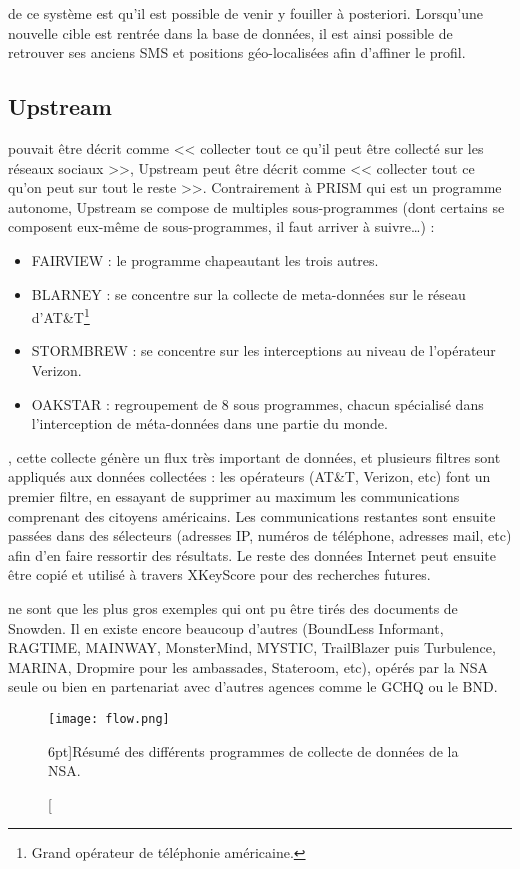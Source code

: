  de ce système est qu'il est possible de venir y
fouiller à posteriori. Lorsqu'une nouvelle cible est rentrée dans la base de
données, il est ainsi possible de retrouver ses anciens SMS et positions
géo-localisées afin d'affiner le profil.

\subsection{Upstream}

 pouvait être décrit comme << collecter tout ce qu'il
peut être collecté sur les réseaux sociaux >>, Upstream peut être décrit comme
<< collecter tout ce qu'on peut sur tout le reste >>. Contrairement à PRISM qui
est un programme autonome, Upstream se compose de multiples sous-programmes
(dont certains se composent eux-même de sous-programmes, il faut arriver à
suivre\ldots) :

\begin{itemize}
  \item FAIRVIEW : le programme chapeautant les trois autres.
  \item BLARNEY : se concentre sur la collecte de meta-données sur le réseau
  d'AT\&T\footnote{Grand opérateur de téléphonie américaine.}
  \item STORMBREW : se concentre sur les interceptions au niveau de l'opérateur
  Verizon.
  \item OAKSTAR : regroupement de 8 sous programmes, chacun spécialisé dans
  l'interception de méta-données dans une partie du monde.
\end{itemize}

, cette collecte génère un flux très important
de données, et plusieurs filtres sont appliqués aux données collectées : les
opérateurs (AT\&T, Verizon, etc) font un premier filtre, en essayant de
supprimer au maximum les communications comprenant des citoyens américains.
Les communications restantes sont ensuite passées dans des sélecteurs (adresses
IP, numéros de téléphone, adresses mail, etc) afin d'en faire ressortir des
résultats. Le reste des données Internet peut ensuite être copié et utilisé à
travers XKeyScore pour des recherches futures.


 ne sont que les plus gros exemples qui ont pu
être tirés des documents de Snowden. Il en existe encore beaucoup d'autres
(BoundLess Informant, RAGTIME, MAINWAY, MonsterMind, MYSTIC, TrailBlazer puis
Turbulence, MARINA, Dropmire pour les ambassades, Stateroom, etc), opérés par
la NSA seule ou bien en partenariat avec d'autres agences comme le GCHQ ou le
BND.

\begin{figure}[h]
\centerline{\texttt{[image: flow.png]}}
\caption[Infographie résumant les différents programmes de
surveillance américains][6pt]{Résumé des différents programmes de collecte de
données de la NSA.}
\label{fig:infographie}
\end{figure}